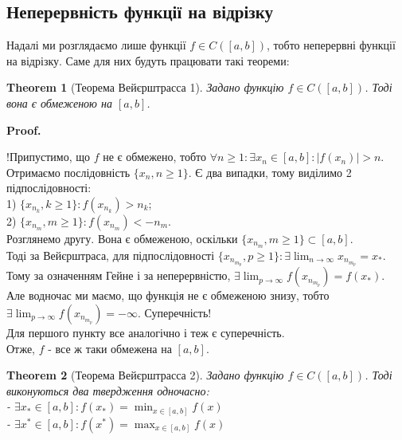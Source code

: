 \documentclass[a4paper, 14pt]{article}
\makeatletter
\def\qed{$\blacksquare$}
\theoremstyle{theoremdd}
\newtheorem{theorem}{Theorem}[subsection]
\theoremstyle{theoremdd}
\theoremstyle{theoremdd}
\theoremstyle{theoremdd}
\theoremstyle{theoremdd}
\theoremstyle{theoremdd}
\theoremstyle{theoremdd}
\theoremstyle{theoremdd}
\renewenvironment{proof}[1][Proof.\\]{\par
\pushQED{\hfill \qed}%
\normalfont \topsep6\p@\@plus6\p@\relax
\trivlist
\item\relax
{\bfseries
#1\@addpunct{.}}\hspace\labelsep\ignorespaces
}{%
\popQED\endtrivlist\@endpefalse
}
\makeatother
\begin{document}
\subsection{Неперервність функції на відрізку}
Надалі ми розглядаємо лише функції $f \in C([a,b])$, тобто неперервні функції на відрізку. Саме для них будуть працювати такі теореми:

\begin{theorem}[Теорема Вейєрштрасса 1]
Задано функцію $f \in C([a,b])$. Тоді вона є обмеженою на $[a,b]$.
\end{theorem}

\begin{proof}
!Припустимо, що $f$ не є обмежено, тобто $\forall n \geq 1: \exists x_n \in [a,b]: |f(x_n)| > n$.\\
Отримаємо послідовність $\{x_n,n \geq 1\}$. Є два випадки, тому виділимо 2 підпослідовності:\\
1) $\{x_{n_k}, k \geq 1\}: f(x_{n_k})>n_k$;\\
2) $\{x_{n_m}, m \geq 1\}: f(x_{n_m})<-n_m$.\\
Розглянемо другу. Вона є обмеженою, оскільки $\{x_{n_m}, m \geq 1\} \subset [a,b]$.\\
Тоді за Вейєрштраса, для підпослідовності $\{x_{n_{m_p}}, p \geq 1\}: \exists \displaystyle \lim_{n \to \infty} x_{n_{m_p}} =x_*$.\\
Тому за означенням Гейне і за неперервністю, $\exists \displaystyle \lim_{p \to \infty} f(x_{n_{m_p}}) = f(x_*)$.\\
Але водночас ми маємо, що функція не є обмеженою знизу, тобто $\exists \displaystyle \lim_{p \to \infty} f(x_{n_{m_p}}) = -\infty$. Суперечність!\\
Для першого пункту все аналогічно і теж є суперечність.\\
Отже, $f$ - все ж таки обмежена на $[a,b]$.
\end{proof}

\begin{theorem}[Теорема Вейєрштрасса 2]
Задано функцію $f \in C([a,b])$. Тоді виконуються два твердження одночасно:\\
- $\displaystyle \exists x_* \in [a,b]: f(x_*) = \min_{x \in [a,b]} f(x)$\\
- $\displaystyle \exists x^* \in [a,b]: f(x^*) = \max_{x \in [a,b]} f(x)$
\end{theorem}
\end{document}
